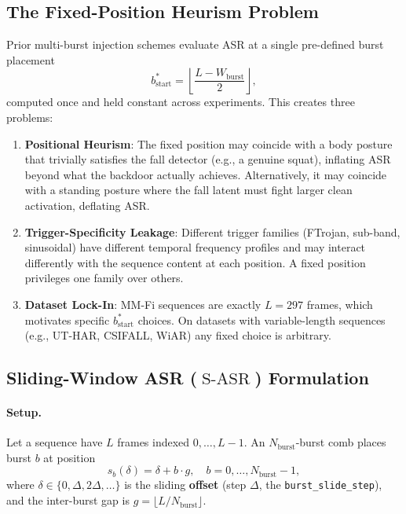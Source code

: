 \documentclass{article}
\newcommand{\SASR}{\operatorname{S-ASR}}
\newcommand{\Nb}{N_{\mathrm{burst}}}
\newcommand{\Wburst}{W_{\mathrm{burst}}}
\begin{document}
\subsection{The Fixed-Position Heurism Problem}

Prior multi-burst injection schemes evaluate ASR at a single pre-defined burst placement
\begin{equation}
  b^*_{\text{start}} = \left\lfloor \frac{L - \Wburst}{2} \right\rfloor,
\end{equation}
computed once and held constant across experiments. This creates three problems:
\begin{enumerate}
    \item \textbf{Positional Heurism}: The fixed position may coincide with a body posture that
          trivially satisfies the fall detector (e.g., a genuine squat), inflating ASR beyond
          what the backdoor actually achieves. Alternatively, it may coincide with a standing
          posture where the fall latent must fight larger clean activation, deflating ASR.
    \item \textbf{Trigger-Specificity Leakage}: Different trigger families (FTrojan, sub-band,
          sinusoidal) have different temporal frequency profiles and may interact differently
          with the sequence content at each position. A fixed position privileges one family
          over others.
    \item \textbf{Dataset Lock-In}: MM-Fi sequences are exactly $L=297$ frames, which motivates
          specific $b^*_{\text{start}}$ choices. On datasets with variable-length sequences
          (e.g., UT-HAR, CSIFALL, WiAR) any fixed choice is arbitrary.
\end{enumerate}

\subsection{Sliding-Window ASR ($\SASR$) Formulation}

\paragraph{Setup.} Let a sequence have $L$ frames indexed $0, \ldots, L-1$. An $\Nb$-burst comb
places burst $b$ at position
\begin{equation}
  s_b(\delta) = \delta + b \cdot g, \quad b = 0, \ldots, \Nb - 1,
\end{equation}
where $\delta \in \{0, \Delta, 2\Delta, \ldots\}$ is the sliding \textbf{offset} (step $\Delta$,
the \texttt{burst\_slide\_step}), and the inter-burst gap is
$g = \lfloor L / \Nb \rfloor$.
\end{document}
